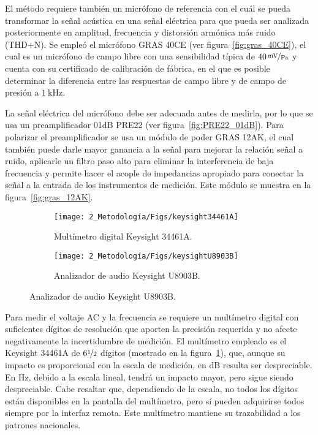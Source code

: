 El método requiere también un micrófono de referencia con el cuál se pueda transformar la señal acústica en una señal eléctrica para que pueda ser analizada posteriormente en amplitud, frecuencia y distorsión armónica más ruido (THD+N).
Se empleó el micrófono GRAS 40CE (ver figura~\ref{fig:gras_40CE}), el cual es un micrófono de campo libre con una sensibilidad típica de $\num{40}\,\nicefrac{\unit{\mV}}{\unit{\Pa}}$ y cuenta con su certificado de calibración de fábrica, en el que es posible determinar la diferencia entre las respuestas de campo libre y de campo de presión a $\qty{1}{\kHz}$.

La señal eléctrica del micrófono debe ser adecuada antes de medirla, por lo que se usa un preamplificador 01dB PRE22 (ver figura~\ref{fig:PRE22_01dB}).
Para polarizar el preamplificador se usa un módulo de poder GRAS 12AK, el cual también puede darle mayor ganancia a la señal para mejorar la relación señal a ruido, aplicarle un filtro paso alto para eliminar la interferencia de baja frecuencia y permite hacer el acople de impedancias apropiado para conectar la señal a la entrada de los instrumentos de medición.
Este módulo se muestra en la figura~\ref{fig:gras_12AK}.

\begin{figure}[!h]
    \caption{Instrumentos de medición para la calibración periódica de calibradores acústicos.}
    \centering
    \begin{subfigure}[t]{0.45\textwidth}
        \centering
        \texttt{[image: 2\_Metodología/Figs/keysight34461A]}
        \caption{Multímetro digital Keysight 34461A.}
        \label{fig:keysight_34461A}
    \end{subfigure}
    \hfill
    \begin{subfigure}[t]{0.45\textwidth}
        \centering
        \texttt{[image: 2\_Metodología/Figs/keysightU8903B]}
        \caption{Analizador de audio Keysight U8903B.}
        \label{fig:keysight_U8903B}
    \end{subfigure}
\end{figure}
%
Para medir el voltaje AC y la frecuencia se requiere un multímetro digital con suficientes dígitos de resolución que aporten la precisión requerida y no afecte negativamente la incertidumbre de medición.
El multímetro empleado es el Keysight 34461A de $6\nicefrac{1}{2}$ dígitos (mostrado en la figura~\ref{fig:keysight_34461A}), que, aunque su impacto es proporcional con la escala de medición, en $\unit{\dB}$ resulta ser despreciable.
En $\unit{\Hz}$, debido a la escala lineal, tendrá un impacto mayor, pero sigue siendo despreciable.
Cabe resaltar que, dependiendo de la escala, no todos los dígitos están disponibles en la pantalla del multímetro, pero sí pueden adquirirse todos siempre por la interfaz remota.
Este multímetro mantiene su trazabilidad a los patrones nacionales.

